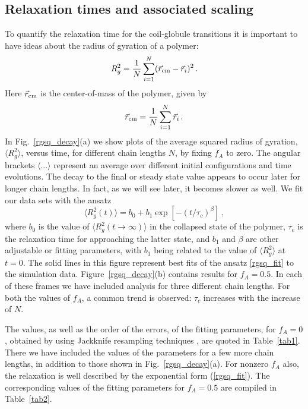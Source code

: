 \documentclass[aps,prx,reprint,showpacs,showkeys,noeprint,longbibliography]{revtex4-1} %
\begin{document}
\subsection{Relaxation times and associated scaling}
To quantify the relaxation time for the coil-globule transitions it is important to have ideas about the radius of gyration of a polymer:
\begin{equation}\label{rgsq_def}
R_g^2 = \frac{1}{N}\sum_{i=1}^{N} (\vec{r}_{\rm{cm}} - \vec{r}_i)^2\,.
\end{equation}
Here $\vec{r}_{\rm{cm}}$ is the center-of-mass of the polymer, given by
\begin{equation}\label{com_def}
\vec{r}_{\rm{cm}}=\frac{1}{N}\sum_{i=1}^{N} \vec{r}_i\,.
\end{equation}
In Fig.~\ref{rgsq_decay}(a) we show plots of the average squared radius of gyration, $\langle R_g^2 \rangle$, versus time, for different chain lengths $N$, by fixing $f_A$ to zero. The angular brackets $\langle ... \rangle$ represent an average over different initial configurations and time evolutions.
The decay to the final or steady state value appears to occur later for longer chain lengths. In fact, as we will see later, it becomes slower as well.
We fit our data sets with the ansatz 
\begin{equation}\label{rgsq_fit}
\langle R_g^2(t) \rangle =b_0+b_1 \exp[-(t/\tau_c)^\beta]\,,
\end{equation}
where $b_0$ is the value of $\langle R_g^2 (t \to \infty) \rangle$ in the collapsed state of the polymer, $\tau_c$ is the relaxation time for approaching the latter state, and $b_1$ and $\beta$ are other adjustable or fitting parameters,
with $b_1$ being related to the value of $\langle R_g^2 \rangle$ at $t=0$. The solid lines in this figure represent best fits of the ansatz \eqref{rgsq_fit} 
to the simulation data. Figure\ \ref{rgsq_decay}(b) contains results for $f_A=0.5$. In each of these frames we have included analysis for three different chain lengths. For both the values of $f_A$, a common trend is observed: $\tau_c$ increases with the increase of $N$.
\par 
The values, as well as the order of the errors, of the fitting parameters, for $f_A=0$, obtained by using Jackknife resampling techniques \cite{efron}, are quoted in Table~\ref{tab1}. There we have included the values 
of the parameters for a few more chain lengths, in addition to those shown in Fig.~\ref{rgsq_decay}(a). For nonzero $f_A$ also, the relaxation is well described by the exponential form (\ref{rgsq_fit}). The corresponding values of the fitting parameters for $f_A=0.5$ are compiled in Table~\ref{tab2}.
\end{document}
